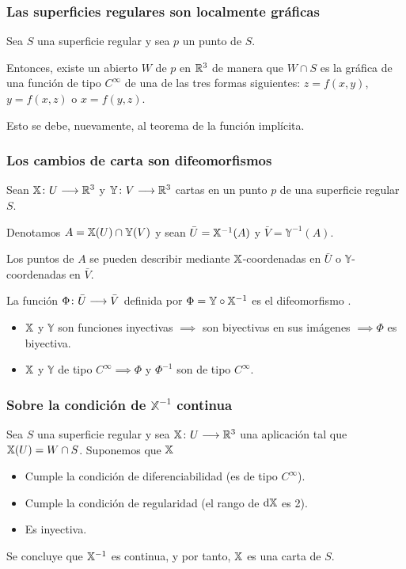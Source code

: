 \subsubsection{Las superficies regulares son localmente gráficas}

Sea $S$ una superficie regular y sea $p$ un punto de $S$.

Entonces, existe un abierto $W$ de $p$ en $\mathbb{R}^3$ de manera que $W\cap S$ es la gráfica de una función de tipo $C^\infty$ de una de las tres formas siguientes: $z = f(x, y)$, $y = f(x, z)$ o $x = f(y, z)$.

Esto se  debe, nuevamente, al teorema de la función implícita.

\subsubsection{Los cambios de carta son difeomorfismos}

Sean $\mathbb{X} \colon U \longrightarrow \mathbb{R}^3$ y $\mathbb{Y} \colon V \longrightarrow \mathbb{R}^3$ cartas en un punto $p$ de una superficie regular $S$.

Denotamos $A = \mathbb{X}(U) \cap \mathbb{Y}(V)$ y sean $\bar{U} = \mathbb{X}^{-1}(A)$ y $\bar{V} = \mathbb{Y}^{-1}(A)$.

Los puntos de $A$ se pueden describir mediante $\mathbb{X}$-coordenadas en $\bar{U}$ o $\mathbb{Y}$-coordenadas en $\bar{V}$.

La función $\Phi \colon \bar{U} \longrightarrow \bar{V}$ definida por $\Phi = \mathbb{Y} \circ \mathbb{X}^{-1}$ es el difeomorfismo .
\begin{itemize}
	\item $\mathbb{X}$ y $\mathbb{Y}$ son funciones inyectivas $\implies$ son biyectivas en sus imágenes $\implies \Phi$ es biyectiva.
	\item $\mathbb{X}$ y $\mathbb{Y}$ de tipo $C^\infty \implies \Phi$ y $\Phi^{-1}$ son de tipo $C^\infty$.
\end{itemize}

\subsubsection{Sobre la condición de $\mathbb{X}^{-1}$ continua}

Sea $S$ una superficie regular y sea $\mathbb{X} \colon U \longrightarrow \mathbb{R}^3$ una aplicación tal que $\mathbb{X}(U) = W \cap S$. Suponemos que $\mathbb{X}$
\begin{itemize}
	\item Cumple la condición de diferenciabilidad (es de tipo $C^\infty$).
	\item Cumple la condición de regularidad (el rango de $\odif{\X}$ es 2).
	\item Es inyectiva.
\end{itemize}
Se concluye que $\mathbb{X}^{-1}$ es continua, y por tanto, $\mathbb{X}$ es una carta de $S$.

